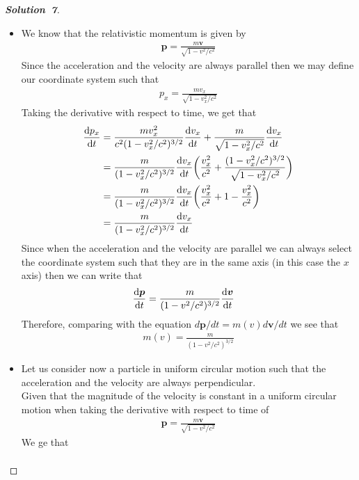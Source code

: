 \documentclass[11pt]{article}
\theoremstyle{definition}
\renewcommand*{\proofname}{\bf{Solution}}
\begin{document}
\cleardoublepage
\begin{proof}[\proofname\ 7]\leavevmode\par
\begin{itemize}
\item [(a)] We know that the relativistic momentum is given by
\begin{align*}
    \bm{p} = \frac{m\bm{v}}{\sqrt{1 - v^2/c^2}}
\end{align*}
Since the acceleration and the velocity are always parallel then we may define
our coordinate system such that 
\begin{align*}
    p_x = \frac{mv_x}{\sqrt{1 - v_x^2/c^2}}
\end{align*}
Taking the derivative with respect to time, we get that
\begin{align*}
    \dv{p_x}{t}
    &= \frac{mv_x^2}{c^2(1 - v_x^2/c^2)^{3/2}}\dv{v_x}{t}
    + \frac{m}{\sqrt{1 - v_x^2/c^2}}\dv{v_x}{t} \\
    &= \frac{m}{(1 - v_x^2/c^2)^{3/2}}\dv{v_x}{t}
    \bigg(\frac{v_x^2}{c^2} 
    + \frac{(1 - v_x^2/c^2)^{3/2}}{\sqrt{1 - v_x^2/c^2}}\bigg) \\
    &= \frac{m}{(1 - v_x^2/c^2)^{3/2}}\dv{v_x}{t}
    \bigg(\frac{v_x^2}{c^2} + 1 - \frac{v_x^2}{c^2}\bigg) \\
    &= \frac{m}{(1 - v_x^2/c^2)^{3/2}}\dv{v_x}{t}
\end{align*}
Since when the acceleration and the velocity are parallel we can always select
the coordinate system such that they are in the same axis
(in this case the $x$ axis) then we can write that
\begin{align*}
    \dv{\bm{p}}{t} &= \frac{m}{(1 - v^2/c^2)^{3/2}}\dv{\bm{v}}{t}
\end{align*}
Therefore, comparing with the equation $d\bm{p}/dt = m(v)d\bm{v}/dt$
we see that
\begin{align*}
    m(v) = \frac{m}{(1 - v^2/c^2)^{3/2}}
\end{align*}
\item [(b)] Let us consider now a particle in uniform circular motion such that
the acceleration and the velocity are always perpendicular.\\
Given that the magnitude of the velocity is constant in a uniform circular
motion when taking the derivative with respect to time of 
\begin{align*}
    \bm{p} = \frac{m\bm{v}}{\sqrt{1 - v^2/c^2}}
\end{align*}
We ge that
\begin{align*}

\end{align*}
\end{itemize}
\end{proof}
\end{document}
